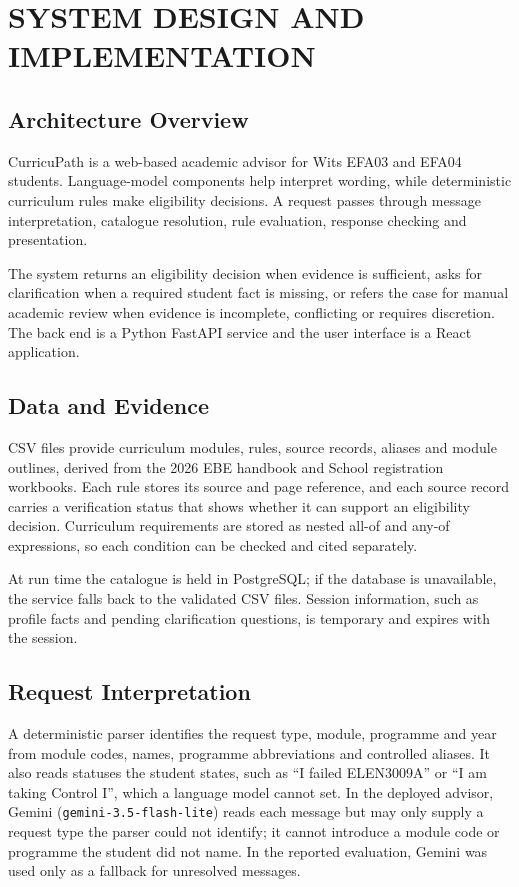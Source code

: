 \section{SYSTEM DESIGN AND IMPLEMENTATION}

\subsection{Architecture Overview}
CurricuPath is a web-based academic advisor for Wits EFA03 and EFA04
students. Language-model components help interpret wording, while
deterministic curriculum rules make eligibility decisions. A request passes
through message interpretation, catalogue resolution, rule evaluation,
response checking and presentation.

The system returns an eligibility decision when evidence is sufficient, asks
for clarification when a required student fact is missing, or refers the case
for manual academic review when evidence is incomplete, conflicting or
requires discretion. The back end is a Python FastAPI service and the user
interface is a React application.

\subsection{Data and Evidence}
CSV files provide curriculum modules, rules, source records, aliases and
module outlines, derived from the 2026 EBE handbook \cite{wits2026ebe} and
School registration workbooks. Each rule stores its source and page
reference, and each source record carries a verification status that shows
whether it can support an eligibility decision. Curriculum requirements are
stored as nested all-of and any-of expressions, so each condition can be
checked and cited separately.

At run time the catalogue is held in PostgreSQL; if the database is
unavailable, the service falls back to the validated CSV files. Session
information, such as profile facts and pending clarification questions, is
temporary and expires with the session.

\subsection{Request Interpretation}
A deterministic parser identifies the request type, module, programme and
year from module codes, names, programme abbreviations and controlled
aliases. It also reads statuses the student states, such as ``I failed
ELEN3009A'' or ``I am taking Control I'', which a language model cannot set.
In the deployed advisor, Gemini (\texttt{gemini-3.5-flash-lite}) reads each
message but may only supply a request type the parser could not identify; it
cannot introduce a module code or programme the student did not name. In the
reported evaluation, Gemini was used only as a fallback for unresolved
messages.

